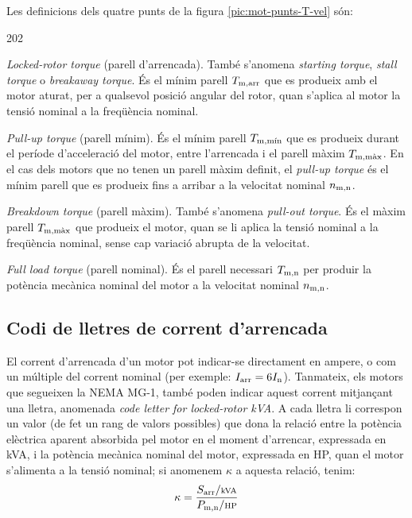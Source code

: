 Les definicions dels quatre punts de la figura  \vref{pic:mot-punts-T-vel} són:
\begin{dingautolist}{202}
   \item \textit{Locked-rotor torque} (parell d'arrencada). També s'anomena \textit{starting torque}, \textit{stall torque} o \textit{breakaway torque}. És el mínim parell $T_\mathrm{m,arr}$ que es produeix amb el motor aturat, per a qualsevol posició angular del rotor, quan s'aplica al motor la tensió nominal a la freqüència nominal.
   \item \textit{Pull-up torque} (parell mínim). És el mínim parell $T_\mathrm{m,\text{mín}}$ que es produeix durant el període d'acceleració del motor, entre l'arrencada  i el parell màxim $T_\mathrm{m,\text{màx}}$. En el cas dels motors que no tenen un parell màxim definit, el \textit{pull-up torque} és el mínim parell que es produeix fins a arribar a la velocitat nominal $n_\mathrm{m,n}$.
   \item \textit{Breakdown torque} (parell màxim). També s'anomena \textit{pull-out torque}. És el màxim parell $T_\mathrm{m,\text{màx}}$ que  produeix  el motor, quan se li aplica  la tensió nominal a la freqüència nominal, sense cap variació abrupta de la velocitat.
   \item \textit{Full load torque} (parell nominal). És el parell necessari $T_\mathrm{m,n}$ per produir la potència mecànica nominal del motor a la velocitat nominal  $n_\mathrm{m,n}$.
\end{dingautolist}

\subsection{Codi de lletres de corrent d'arrencada}

El corrent d'arrencada d'un motor pot indicar-se directament en ampere, o com un múltiple del corrent nominal (per exemple: $I_\mathrm{arr} = 6 I_\mathrm{n}$). Tanmateix, els motors que segueixen la NEMA MG-1, també poden indicar aquest corrent mitjançant una lletra, anomenada \textit{code letter for locked-rotor kVA}. A cada lletra li correspon un valor (de fet un rang de valors possibles) que dona la relació entre la potència elèctrica aparent absorbida pel motor en el moment d'arrencar, expressada en kVA, i la potència mecànica nominal del motor, expressada en HP, quan el motor s'alimenta a la tensió nominal; si anomenem $\kappa$ a aquesta relació, tenim:
\begin{equation}
    \kappa = \frac{S\ped{arr}/{\scriptstyle\unit{kVA}}}{P\ped{m,n}/{\scriptstyle \unit{HP}}}
\end{equation}

